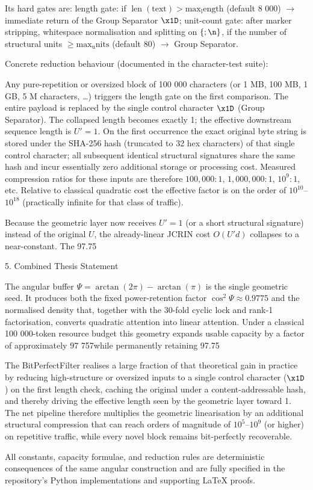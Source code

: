 Its hard gates are:
length gate: if \(\operatorname{len}(\text{text}) > \operatorname{max_length}\) (default 8 000) \(\to\) immediate return of the Group Separator \(\texttt{\x1D}\);
unit-count gate: after marker stripping, whitespace normalisation and splitting on \(\{;\n\}\), if the number of structural units \(\ge \operatorname{max_units}\) (default 80) \(\to\) Group Separator.

Concrete reduction behaviour (documented in the character-test suite):

Any pure-repetition or oversized block of 100 000 characters (or 1 MB, 100 MB, 1 GB, 5 M characters, \ldots) triggers the length gate on the first comparison.
The entire payload is replaced by the single control character \(\texttt{\x1D}\) (Group Separator).
The collapsed length becomes exactly 1; the effective downstream sequence length is \(U' = 1\).
On the first occurrence the exact original byte string is stored under the SHA-256 hash (truncated to 32 hex characters) of that single control character; all subsequent identical structural signatures share the same hash and incur essentially zero additional storage or processing cost.
Measured compression ratios for these inputs are therefore \(100{,}000:1\), \(1{,}000{,}000:1\), \(10^9:1\), etc. Relative to classical quadratic cost the effective factor is on the order of \(10^{10}\)–\(10^{18}\) (practically infinite for that class of traffic).

Because the geometric layer now receives \(U' = 1\) (or a short structural signature) instead of the original \(U\), the already-linear JCRIN cost \(O(U'd)\) collapses to a near-constant. The 97.75 %

5. Combined Thesis Statement

The angular buffer \(\Psi = \arctan(2\pi)-\arctan(\pi)\) is the single geometric seed. It produces both the fixed power-retention factor \(\cos^2\Psi \approx 0.9775\) and the normalised density that, together with the 30-fold cyclic lock and rank-1 factorisation, converts quadratic attention into linear attention. Under a classical 100 000-token resource budget this geometry expands usable capacity by a factor of approximately 97 757\times while permanently retaining 97.75 %

The BitPerfectFilter realises a large fraction of that theoretical gain in practice by reducing high-structure or oversized inputs to a single control character (\(\texttt{\x1D}\)) on the first length check, caching the original under a content-addressable hash, and thereby driving the effective length seen by the geometric layer toward 1. The net pipeline therefore multiplies the geometric linearisation by an additional structural compression that can reach orders of magnitude of \(10^5\)–\(10^9\) (or higher) on repetitive traffic, while every novel block remains bit-perfectly recoverable.

All constants, capacity formulae, and reduction rules are deterministic consequences of the same angular construction and are fully specified in the repository’s Python implementations and supporting LaTeX proofs.
